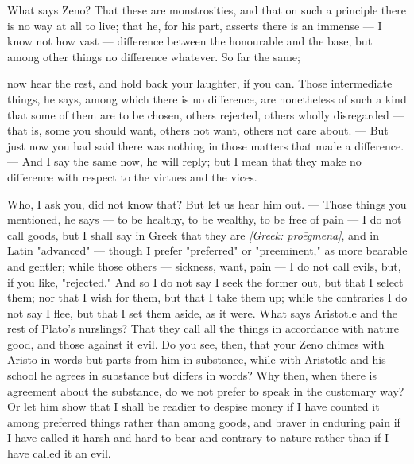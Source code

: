  What says Zeno? That these are monstrosities, and that on such a principle there is no way at all to live; that he, for his part, asserts there is an immense — I know not how vast — difference between the honourable and the base, but among other things no difference whatever. So far the same;

 now hear the rest, and hold back your laughter, if you can. Those intermediate things, he says, among which there is no difference, are nonetheless of such a kind that some of them are to be chosen, others rejected, others wholly disregarded — that is, some you should want, others not want, others not care about. — But just now you had said there was nothing in those matters that made a difference. — And I say the same now, he will reply; but I mean that they make no difference with respect to the virtues and the vices.

 Who, I ask you, did not know that? But let us hear him out. — Those things you mentioned, he says — to be healthy, to be wealthy, to be free of pain — I do not call goods, but I shall say in Greek that they are \textit{[Greek: proēgmena]}, and in Latin "advanced" — though I prefer "preferred" or "preeminent," as more bearable and gentler; while those others — sickness, want, pain — I do not call evils, but, if you like, "rejected." And so I do not say I seek the former out, but that I select them; nor that I wish for them, but that I take them up; while the contraries I do not say I flee, but that I set them aside, as it were. What says Aristotle and the rest of Plato's nurslings? That they call all the things in accordance with nature good, and those against it evil. Do you see, then, that your Zeno chimes with Aristo in words but parts from him in substance, while with Aristotle and his school he agrees in substance but differs in words? Why then, when there is agreement about the substance, do we not prefer to speak in the customary way? Or let him show that I shall be readier to despise money if I have counted it among preferred things rather than among goods, and braver in enduring pain if I have called it harsh and hard to bear and contrary to nature rather than if I have called it an evil.

